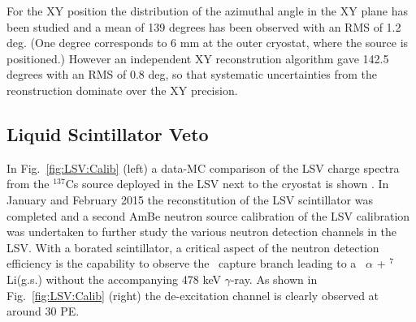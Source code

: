For the XY position the distribution of the azimuthal angle in the XY plane has been studied and a mean of 139 degrees has been observed with an RMS of 1.2 deg. (One degree corresponds to 6 mm at the outer cryostat, where the source is positioned.) However an independent XY reconstrution algorithm gave 142.5 degrees with an RMS of 0.8 deg, so that systematic uncertainties from the reonstruction dominate over the XY precision. %



\subsection{Liquid Scintillator Veto}\label{sec:LSV:gammasources}

In Fig.~\ref{fig:LSV:Calib} (left) a data-MC comparison of the LSV charge spectra from the $^{137}$Cs source deployed in the LSV next to the cryostat is shown \cite{DS50:G4DS:paper}.
In January and February 2015 the reconstitution of the LSV scintillator was completed and a second AmBe neutron source calibration of the LSV calibration was undertaken to further study the various neutron detection channels in the LSV. With a borated scintillator, a critical aspect of the neutron detection efficiency is the capability to observe the \brbortenground\
capture branch leading to a \enbortengroundalpha\ $\alpha$ + $^7$Li(g.s.) without the accompanying 478 keV $\gamma$-ray. As shown in Fig.~\ref{fig:LSV:Calib} (right) the de-excitation channel is clearly observed at around 30 PE.

